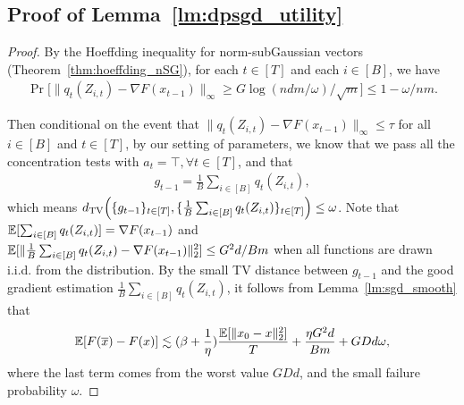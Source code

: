 \subsection{Proof of Lemma~\ref{lm:dpsgd_utility}}
\dgsgdutility*
\begin{proof}
By the Hoeffding inequality for norm-subGaussian vectors (Theorem~\ref{thm:hoeffding_nSG}), for each $t\in[T]$ and each $i\in[B]$, we have
\begin{align*}
    \Pr\Big[\|q_t(Z_{i,t})-\nabla F(x_{t-1})\|_\infty \ge G\log(ndm/\omega)/\sqrt{m}\Big]\le 1-\omega/nm.
\end{align*}


Then conditional on the event that $\|q_t(Z_{i,t})-\nabla F(x_{t-1})\|_\infty\le \tau$ for all $i\in[B]$ and $t\in[T]$,
by our setting of parameters, we know that we pass all the concentration tests with $a_t=\top,\forall t\in[T]$, and that
\begin{align*}
    g_{t-1}=\frac{1}{B}\sum_{i\in[B]}q_t(Z_{i,t}),
\end{align*}
which means $d_{\mathrm{TV}}\Big(\{g_{t-1}\}_{t\in[T]},\{\frac{1}{B}\sum_{i\in[B]}q_t(Z_{i,t})\}_{t\in[T]}\Big)\le \omega$.
Note that $\operatorname*{\mathbb{E}}[\sum_{i\in[B]}q_t(Z_{i,t})]=\nabla F(x_{t-1})$ and $\operatorname*{\mathbb{E}}[\|\frac{1}{B}\sum_{i\in[B]}q_t(Z_{i,t})-\nabla F(x_{t-1})\|_2^2 ]\le G^2d/Bm$ when all functions are drawn i.i.d. from the distribution.
By the small TV distance between $g_{t-1}$ and the good gradient estimation $\frac{1}{B}\sum_{i\in[B]}q_t(Z_{i,t})$, 
it follows from Lemma~\ref{lm:sgd_smooth} that
\begin{align*}
    \operatorname*{\mathbb{E}}[F(\overline{x})-F(x)]\lesssim (\beta+\frac{1}{\eta})\frac{\operatorname*{\mathbb{E}}[\|x_0-x\|^2_2]}{T}+\frac{\eta G^2d}{Bm}+GDd\omega,
\end{align*}
where the last term comes from the worst value $GDd$, and the small failure probability $\omega$.
\end{proof}

